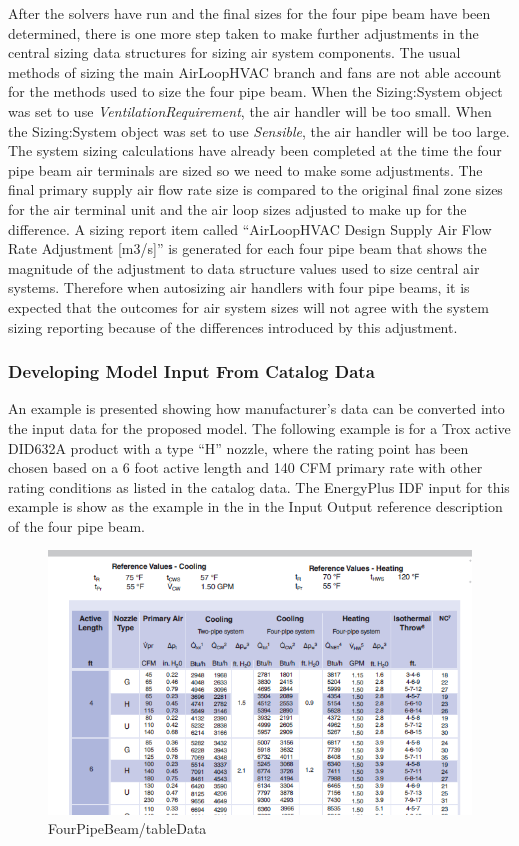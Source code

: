 After the solvers have run and the final sizes for the four pipe beam have been determined, there is one more step taken to make further adjustments in the central sizing data structures for sizing air system components. The usual methods of sizing the main AirLoopHVAC branch and fans are not able account for the methods used to size the four pipe beam. When the Sizing:System object was set to use \emph{VentilationRequirement}, the air handler will be too small. When the Sizing:System object was set to use \emph{Sensible}, the air handler will be too large. The system sizing calculations have already been completed at the time the four pipe beam air terminals are sized so we need to make some adjustments. The final primary supply air flow rate size is compared to the original final zone sizes for the air terminal unit and the air loop sizes adjusted to make up for the difference. A sizing report item called ``AirLoopHVAC Design Supply Air Flow Rate Adjustment {[}m3/s{]}'' is generated for each four pipe beam that shows the magnitude of the adjustment to data structure values used to size central air systems. Therefore when autosizing air handlers with four pipe beams, it is expected that the outcomes for air system sizes will not agree with the system sizing reporting because of the differences introduced by this adjustment.

\subsubsection{Developing Model Input From Catalog Data}\label{developing-model-input-from-catalog-data}

An example is presented showing how manufacturer's data can be converted into the input data for the proposed model. The following example is for a Trox active DID632A product with a type ``H'' nozzle, where the rating point has been chosen based on a 6 foot active length and 140 CFM primary rate with other rating conditions as listed in the catalog data. The EnergyPlus IDF input for this example is show as the example in the in the Input Output reference description of the four pipe beam.

\begin{figure}[htbp]
\centering
\includegraphics{media/TroxDID632A_Tabledata.png}
\caption{FourPipeBeam/tableData}
\end{figure}

